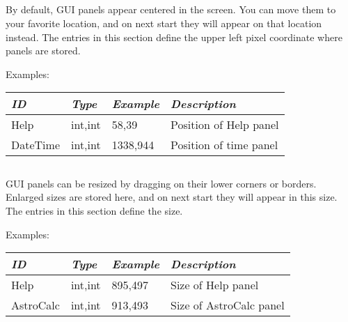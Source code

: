 \subsection{}\label{sec:config.ini:DialogPositions}

By default, GUI panels appear centered in the screen. You can move them to your favorite location, 
and on next start they will appear on that location instead.
The entries in this section define the upper left pixel coordinate where panels are stored.

Examples:

\begin{longtabu} to \textwidth {l|l|l|X}
\toprule
\emph{ID}     & \emph{Type} & \emph{Example}&\emph{Description}     \\\midrule
Help          & int,int     &  58,39        & Position of Help panel\\\midrule
DateTime      & int,int     &  1338,944     & Position of time panel\\\bottomrule
\end{longtabu}


\subsection{}\label{sec:config.ini:DialogSizes}

GUI panels can be resized by dragging on their lower corners or borders.  
Enlarged sizes are stored here, and on next start they will appear in this size.
The entries in this section define the size.

Examples:

\begin{longtabu} to \textwidth {l|l|l|X}
\toprule
\emph{ID}     & \emph{Type} & \emph{Example}&\emph{Description}      \\\midrule
Help          & int,int     &  895,497      & Size of Help panel     \\\midrule
AstroCalc     & int,int     &  913,493      & Size of AstroCalc panel\\\bottomrule
\end{longtabu}





